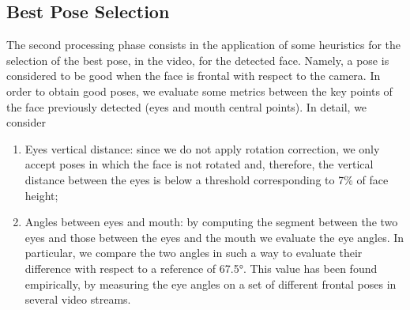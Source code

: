 \documentclass[10pt,a4paper]{report}
\begin{document}
\subsection*{Best Pose Selection}
The second processing phase consists in the application of some heuristics for the selection of the best pose, in the video, for the detected face. Namely, a pose is considered to be good when the face is frontal with respect to the camera. In order to obtain good poses, we evaluate some metrics between the key points of the face previously detected (eyes and mouth central points). In detail, we consider
\begin{enumerate}
\item Eyes vertical distance: since we do not apply rotation correction, we only accept poses in which the face is not rotated and, therefore, the vertical distance between the eyes is below a threshold corresponding to 7\% of face height;
\item Angles between eyes and mouth: by computing the segment between the two eyes and those between the eyes and the mouth we evaluate the eye angles. In particular, we compare the two angles in such a way to evaluate their difference with respect to a reference of 67.5°. This value has been found empirically, by measuring the eye angles on a set of different frontal poses in several video streams.
\end{enumerate}
\end{document}
